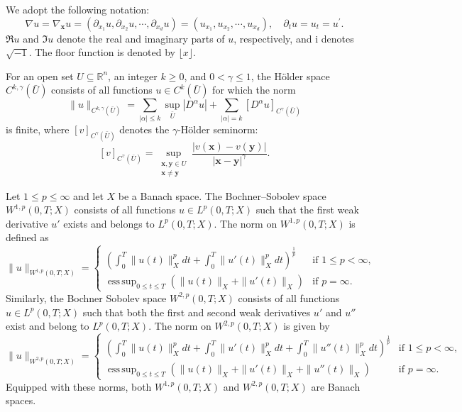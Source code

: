 \documentclass[11pt,reqno,oneside]{amsart}
\numberwithin{equation}{section}
\theoremstyle{definition}
\theoremstyle{remark}
\numberwithin{equation}{section}
\begin{document}
	We adopt the following notation:
	$$
	\nabla u =\nabla_{\mathbf{x}}u=\left(\partial_{{x}_1}u,\partial_{{x}_2}u,\cdots,\partial_{{x}_d}u\right)=\left(u_{{x}_1},u_{{x}_2},\cdots,u_{{x}_d}\right),\quad \partial_{t}u=u_t=u^\prime.
	$$
	$\Re u$ and $\Im u$ denote the real and imaginary parts of $u$, respectively, and $\mathrm{i}$ denotes $\sqrt{-1}$. The floor function is denoted by $\lfloor x \rfloor$.
	
	For an open set $U \subseteq \mathbb{R}^n$, an integer $k \geq 0$, and $0 < \gamma \leq 1$, the H\" older space $C^{k,\gamma}(\bar{U})$ consists of all functions $u \in C^k(\bar{U})$ for which the norm
	$$
	\|u\|_{C^{k,\gamma}(\bar{U})} = \sum_{|\alpha| \leq k} \sup_{\bar{U}} |D^{\alpha}u| + \sum_{|\alpha| = k} [D^{\alpha}u]_{C^{\gamma}(\bar{U})}
	$$
	is finite, where $[v]_{C^{\gamma}(\bar{U})}$ denotes the $\gamma$-H\" older seminorm:
	$$
	[v]_{C^{\gamma}(\bar{U})} = \sup_{\substack{\mathbf{x},\mathbf{y} \in U \\ \mathbf{x} \neq \mathbf{y}}} \frac{|v(\mathbf{x})-v(\mathbf{y})|}{|\mathbf{x}-\mathbf{y}|^{\gamma}}.
	$$
	
	Let $1 \leq p \leq \infty$ and let $X$ be a Banach space. The Bochner–Sobolev space $W^{1,p}(0,T;X)$ consists of all functions $u \in L^p(0,T;X)$ such that the first weak derivative $u'$ exists and belongs to $L^p(0,T;X)$. The norm on $W^{1,p}(0,T;X)$ is defined as
	\[
	\|u\|_{W^{1,p}(0,T;X)} = 
	\begin{cases}
		\left(\int_0^T \|u(t)\|_X^p  dt + \int_0^T \|u'(t)\|_X^p  dt\right)^{\frac{1}{p}} & \text{if } 1 \leq p < \infty, \\
		\operatorname{ess\,sup}_{0 \leq t \leq T} \left(\|u(t)\|_X + \|u'(t)\|_X\right) & \text{if } p = \infty.
	\end{cases}
	\]
	Similarly, the Bochner Sobolev space $W^{2,p}(0,T;X)$ consists of all functions $u \in L^p(0,T;X)$ such that both the first and second weak derivatives $u'$ and $u''$ exist and belong to $L^p(0,T;X)$. The norm on $W^{2,p}(0,T;X)$ is given by
	\[
	\|u\|_{W^{2,p}(0,T;X)} = 
	\begin{cases}
		\left(\int_0^T \|u(t)\|_X^p  dt + \int_0^T \|u'(t)\|_X^p  dt + \int_0^T \|u''(t)\|_X^p  dt\right)^{\frac{1}{p}} & \text{if } 1 \leq p < \infty, \\
		\operatorname{ess\,sup}_{0 \leq t \leq T} \left(\|u(t)\|_X + \|u'(t)\|_X + \|u''(t)\|_X\right) & \text{if } p = \infty.
	\end{cases}
	\]
	Equipped with these norms, both $W^{1,p}(0,T;X)$ and $W^{2,p}(0,T;X)$ are Banach spaces.
	
\end{document}
